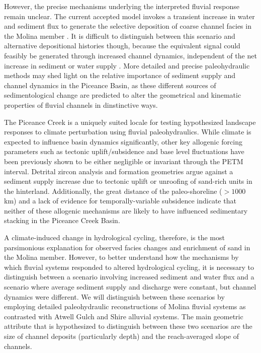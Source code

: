 \documentclass[draft]{compact_proposal}
\begin{document}
However, the precise mechanisms underlying the interpreted fluvial response remain unclear.
The current accepted model invokes a transient increase in water and sediment flux to generate the selective deposition of coarse channel facies in the Molina member \cnote[bzf].
It is difficult to distinguish between this scenario and alternative depositional histories though, because the equivalent signal could feasibly be generated through increased channel dynamics, independent of the net increase in sediment or water supply .
More detailed and precise paleohydraulic methods may shed light on the relative importance of sediment supply and channel dynamics in the Piceance Basin, as these different sources of sedimentological change are predicted to alter the geometrical and kinematic properties of fluvial channels in dinstinctive ways.

The Piceance Creek is a uniquely suited locale for testing hypothesized landscape responses to climate perturbation using fluvial paleohydraulics.
While climate is expected to influence basin dynamics significantly, other key allogenic forcing parameters such as tectonic uplift/subsidence and base level fluctuations have been previously shown to be either negligible or invariant through the PETM interval.
Detrital zircon analysis and formation geometries argue against a sediment supply increase due to tectonic uplift or unroofing of sand-rich units in the hinterland.
Additionally, the great distance of the paleo-shoreline ($>1000$km) and a lack of evidence for temporally-variable subsidence indicate that neither of these allogenic mechanisms are likely to have influenced sedimentary stacking in the Piceance Creek Basin.

%
%
%
%

A climate-induced change in hydrological cycling, therefore, is the most parsimonious explanation for observed facies changes and enrichment of sand in the Molina member.
However, to better understand how the mechanisms by which fluvial systems responded to altered hydrological cycling, it is necessary to distinguish between a scenario involving increased sediment and water flux and a scenario where average sediment supply and discharge were constant, but channel dynamics were different.
We will distinguish between these scenarios by employing detailed paleohydraulic reconstructions of Molina fluvial systems as contrasted with Atwell Gulch and Shire alluvial systems.
The main geometric attribute that is hypothesized to distinguish between these two scenarios are the size of channel deposits (particularly depth) and the reach-averaged slope of channels.
\end{document}
